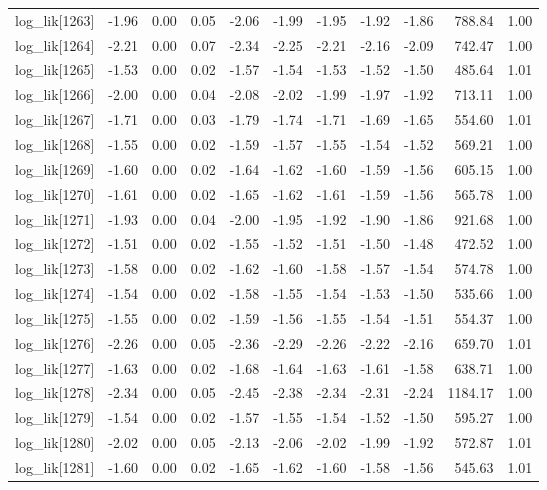 \begin{table}[ht]
\begin{tabular}{rrrrrrrrrrr}
  log\_lik[1263] & -1.96 & 0.00 & 0.05 & -2.06 & -1.99 & -1.95 & -1.92 & -1.86 & 788.84 & 1.00 \\ 
  log\_lik[1264] & -2.21 & 0.00 & 0.07 & -2.34 & -2.25 & -2.21 & -2.16 & -2.09 & 742.47 & 1.00 \\ 
  log\_lik[1265] & -1.53 & 0.00 & 0.02 & -1.57 & -1.54 & -1.53 & -1.52 & -1.50 & 485.64 & 1.01 \\ 
  log\_lik[1266] & -2.00 & 0.00 & 0.04 & -2.08 & -2.02 & -1.99 & -1.97 & -1.92 & 713.11 & 1.00 \\ 
  log\_lik[1267] & -1.71 & 0.00 & 0.03 & -1.79 & -1.74 & -1.71 & -1.69 & -1.65 & 554.60 & 1.01 \\ 
  log\_lik[1268] & -1.55 & 0.00 & 0.02 & -1.59 & -1.57 & -1.55 & -1.54 & -1.52 & 569.21 & 1.00 \\ 
  log\_lik[1269] & -1.60 & 0.00 & 0.02 & -1.64 & -1.62 & -1.60 & -1.59 & -1.56 & 605.15 & 1.00 \\ 
  log\_lik[1270] & -1.61 & 0.00 & 0.02 & -1.65 & -1.62 & -1.61 & -1.59 & -1.56 & 565.78 & 1.00 \\ 
  log\_lik[1271] & -1.93 & 0.00 & 0.04 & -2.00 & -1.95 & -1.92 & -1.90 & -1.86 & 921.68 & 1.00 \\ 
  log\_lik[1272] & -1.51 & 0.00 & 0.02 & -1.55 & -1.52 & -1.51 & -1.50 & -1.48 & 472.52 & 1.00 \\ 
  log\_lik[1273] & -1.58 & 0.00 & 0.02 & -1.62 & -1.60 & -1.58 & -1.57 & -1.54 & 574.78 & 1.00 \\ 
  log\_lik[1274] & -1.54 & 0.00 & 0.02 & -1.58 & -1.55 & -1.54 & -1.53 & -1.50 & 535.66 & 1.00 \\ 
  log\_lik[1275] & -1.55 & 0.00 & 0.02 & -1.59 & -1.56 & -1.55 & -1.54 & -1.51 & 554.37 & 1.00 \\ 
  log\_lik[1276] & -2.26 & 0.00 & 0.05 & -2.36 & -2.29 & -2.26 & -2.22 & -2.16 & 659.70 & 1.01 \\ 
  log\_lik[1277] & -1.63 & 0.00 & 0.02 & -1.68 & -1.64 & -1.63 & -1.61 & -1.58 & 638.71 & 1.00 \\ 
  log\_lik[1278] & -2.34 & 0.00 & 0.05 & -2.45 & -2.38 & -2.34 & -2.31 & -2.24 & 1184.17 & 1.00 \\ 
  log\_lik[1279] & -1.54 & 0.00 & 0.02 & -1.57 & -1.55 & -1.54 & -1.52 & -1.50 & 595.27 & 1.00 \\ 
  log\_lik[1280] & -2.02 & 0.00 & 0.05 & -2.13 & -2.06 & -2.02 & -1.99 & -1.92 & 572.87 & 1.01 \\ 
  log\_lik[1281] & -1.60 & 0.00 & 0.02 & -1.65 & -1.62 & -1.60 & -1.58 & -1.56 & 545.63 & 1.01 \\ 

\end{tabular}
\end{table}
